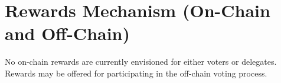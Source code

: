 \section{Rewards Mechanism (On-Chain and Off-Chain)}

No on-chain rewards are currently envisioned for either voters or delegates.   Rewards may be offered for participating in the off-chain voting process.
